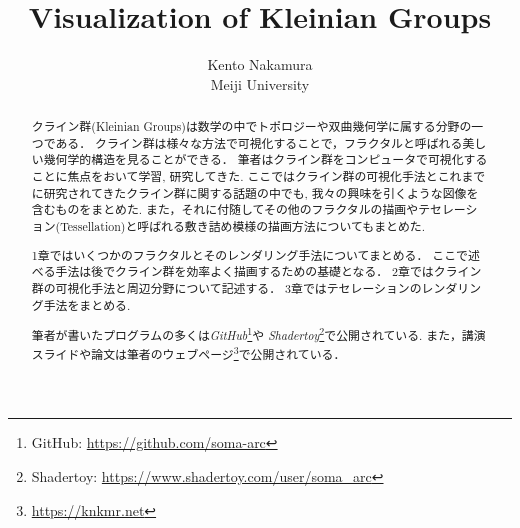 \documentclass[uplatex, dvipdfmx]{jsarticle}
\title{ Visualization of Kleinian Groups }
\author{ Kento Nakamura\\
Meiji University\\
}
\date{}
\begin{document}
\maketitle

\begin{abstract}
クライン群(Kleinian Groups)は数学の中でトポロジーや双曲幾何学に属する分野の一つである．
クライン群は様々な方法で可視化することで，フラクタルと呼ばれる美しい幾何学的構造を見ることができる．
筆者はクライン群をコンピュータで可視化することに焦点をおいて学習, 研究してきた.
ここではクライン群の可視化手法とこれまでに研究されてきたクライン群に関する話題の中でも, 我々の興味を引くような図像を含むものをまとめた.
また，それに付随してその他のフラクタルの描画やテセレーション(Tessellation)と呼ばれる敷き詰め模様の描画方法についてもまとめた.

1章ではいくつかのフラクタルとそのレンダリング手法についてまとめる．
ここで述べる手法は後でクライン群を効率よく描画するための基礎となる．
2章ではクライン群の可視化手法と周辺分野について記述する．
3章ではテセレーションのレンダリング手法をまとめる.

筆者が書いたプログラムの多くは\textit{GitHub}\footnote{GitHub: \url{https://github.com/soma-arc}}や
\textit{Shadertoy}\footnote{Shadertoy: \url{https://www.shadertoy.com/user/soma\_arc}}で公開されている.
また，講演スライドや論文は筆者のウェブページ\footnote{\url{https://knkmr.net}}で公開されている．

\end{abstract}

\clearpage

\tableofcontents

\clearpage







\printbibliography
\end{document}
